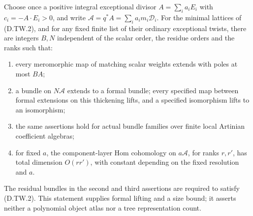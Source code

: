 \begin{proposition}
\label{D:SNC-tree-uniform-Hom-depth}
Choose once a positive integral exceptional divisor
$A=\sum_i a_iE_i$ with $c_i=-A\cdot E_i>0$, and
write $\mathcal A=q^*A=\sum_i a_i m_i\mathcal D_i$.
For the minimal lattices of (D.TW.2), and for any fixed
finite list of their ordinary exceptional twists,
there are integers $B,N$ independent of the scalar
order, the residue orders and the ranks such that:
\begin{enumerate}
\item every meromorphic map of matching scalar weights
extends with poles at most $BA$;
\item a bundle on $N\mathcal A$ extends to a formal
bundle; every specified map between formal extensions
on this thickening lifts, and a specified isomorphism
lifts to an isomorphism;
\item the same assertions hold for actual bundle families
over finite local Artinian coefficient algebras;
\item for fixed $a$, the component-layer Hom cohomology
on $a\mathcal A$, for ranks $r,r'$, has total dimension
$O(rr')$, with constant depending on the fixed resolution
and $a$.
\end{enumerate}
The residual bundles in the second and third assertions
are required to satisfy (D.TW.2). This statement supplies
formal lifting and a size bound; it asserts neither a
polynomial object atlas nor a tree representation count.
\end{proposition}

